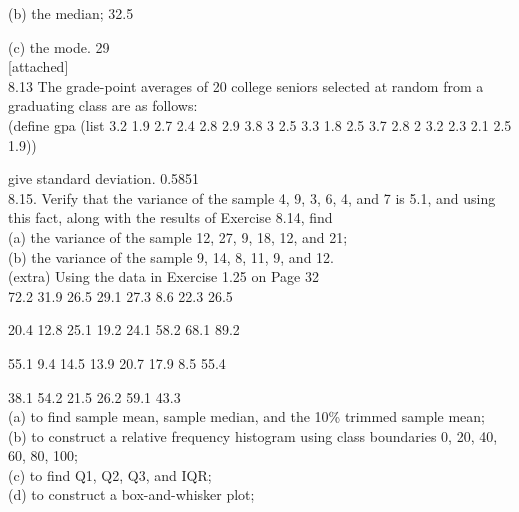 (b) the median; 32.5

(c) the mode. 29 \\

[attached] \\[0.5cm]

8.13 The grade-point averages of 20 college seniors selected at random from a graduating class are as follows: \\

(define gpa 
(list 3.2 1.9 2.7 2.4 2.8 2.9 3.8 3 2.5 3.3 1.8 2.5 3.7 2.8 2 3.2 2.3 2.1 2.5 1.9))

give standard deviation. 0.5851 \\[.5cm]

8.15. Verify that the variance of the sample 4, 9, 3, 6, 4, and 7 is 5.1, and using this fact, along with the results of Exercise 8.14, find \\

(a) the variance of the sample 12, 27, 9, 18, 12, and 21; \\

(b) the variance of the sample 9, 14, 8, 11, 9, and 12. \\


(extra) Using the data in Exercise 1.25 on Page 32  \\

72.2	31.9	26.5	29.1	27.3	8.6	22.3	26.5

20.4	12.8	25.1	19.2	24.1	58.2	68.1	89.2

55.1	9.4	14.5	13.9	20.7	17.9	8.5	55.4

38.1	54.2	21.5	26.2	59.1	43.3		 \\

(a) to find sample mean, sample median, and the 10\% trimmed sample mean; \\


(b) to construct a relative frequency histogram using class boundaries 0, 20, 40, 60, 80, 100; \\

(c) to find Q1, Q2, Q3, and IQR; \\

(d) to construct a box-and-whisker plot; \\


